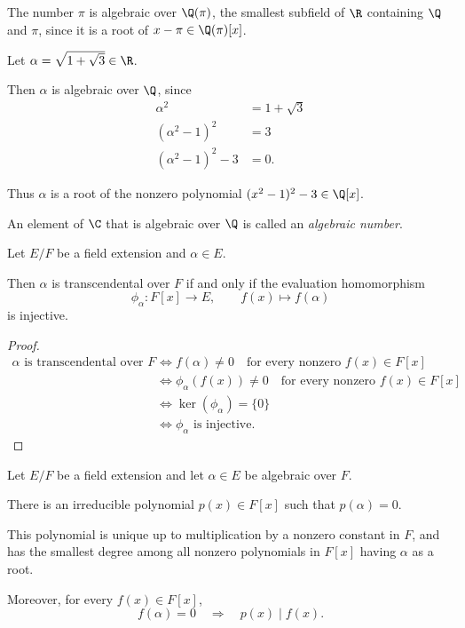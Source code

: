 \documentclass[main.tex]{subfiles}
\begin{document}
\begin{example}
The number $\pi$ is algebraic over $\Q(\pi)$, the smallest
subfield of $\R$ containing $\Q$ and $\pi$, since it is a root
of $x-\pi\in\Q(\pi)[x]$.
\end{example}


\begin{example}
Let $\alpha=\sqrt{1+\sqrt{3}}\in\R$.

Then $\alpha$ is algebraic over $\Q$, since
\[
\begin{aligned}
\alpha^2&=1+\sqrt{3}\\
(\alpha^2-1)^2&=3\\
(\alpha^2-1)^2-3&=0.
\end{aligned}
\]

Thus $\alpha$ is a root of the nonzero polynomial
$(x^2-1)^2-3\in\Q[x]$.
\end{example}


An element of $\C$ that is algebraic over $\Q$ is called an
\emph{algebraic number}.



\begin{theorem}
Let $E/F$ be a field extension and $\alpha\in E$.

Then $\alpha$ is transcendental over $F$ if and only if the
evaluation homomorphism
\[
\phi_\alpha:F[x]\longrightarrow E,
\qquad f(x)\longmapsto f(\alpha)
\]
is injective.
\end{theorem}


\begin{proof}
\[
\begin{aligned}
\alpha\text{ is transcendental over }F
&\iff f(\alpha)\ne0
\quad\text{for every nonzero }f(x)\in F[x]\\
&\iff \phi_\alpha(f(x))\ne0
\quad\text{for every nonzero }f(x)\in F[x]\\
&\iff \ker(\phi_\alpha)=\{0\}\\
&\iff \phi_\alpha\text{ is injective}.
\end{aligned}
\]
\end{proof}



\begin{theorem}
Let $E/F$ be a field extension and let $\alpha\in E$ be
algebraic over $F$.

There is an irreducible polynomial $p(x)\in F[x]$ such that
$p(\alpha)=0$.

This polynomial is unique up to multiplication by a nonzero
constant in $F$, and has the smallest degree among all nonzero
polynomials in $F[x]$ having $\alpha$ as a root.

Moreover, for every $f(x)\in F[x]$,
\[
f(\alpha)=0\quad\Longrightarrow\quad p(x)\mid f(x).
\]
\end{theorem}
\end{document}
